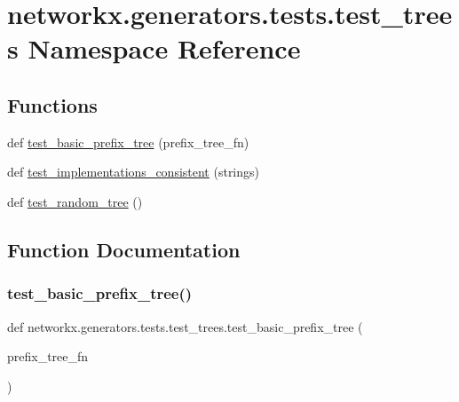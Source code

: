 \hypertarget{namespacenetworkx_1_1generators_1_1tests_1_1test__trees}{}\section{networkx.\+generators.\+tests.\+test\+\_\+trees Namespace Reference}
\label{namespacenetworkx_1_1generators_1_1tests_1_1test__trees}
\subsection*{Functions}
\begin{DoxyCompactItemize}
\item 
def \hyperlink{namespacenetworkx_1_1generators_1_1tests_1_1test__trees_a51373bfd2b4d08cc7ca2d048906d8e5b}{test\+\_\+basic\+\_\+prefix\+\_\+tree} (prefix\+\_\+tree\+\_\+fn)
\item 
def \hyperlink{namespacenetworkx_1_1generators_1_1tests_1_1test__trees_a432acb615a4fee4c80e8aab498a0ff4c}{test\+\_\+implementations\+\_\+consistent} (strings)
\item 
def \hyperlink{namespacenetworkx_1_1generators_1_1tests_1_1test__trees_a8f70e757c26082ecb64f9930f7622dc1}{test\+\_\+random\+\_\+tree} ()
\end{DoxyCompactItemize}


\subsection{Function Documentation}
\mbox{\label{namespacenetworkx_1_1generators_1_1tests_1_1test__trees_a51373bfd2b4d08cc7ca2d048906d8e5b}} 
\subsubsection{\texorpdfstring{test\+\_\+basic\+\_\+prefix\+\_\+tree()}{test\_basic\_prefix\_tree()}}
{\footnotesize\ttfamily def networkx.\+generators.\+tests.\+test\+\_\+trees.\+test\+\_\+basic\+\_\+prefix\+\_\+tree (\begin{DoxyParamCaption}\item[{}]{prefix\+\_\+tree\+\_\+fn }\end{DoxyParamCaption})}

